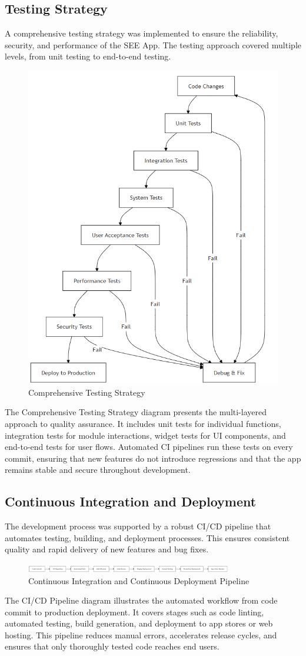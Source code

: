 ﻿\documentclass[12pt,a4paper]{article}
\newcommand{\sectiontitle}[1]{\subsection{#1}}
\begin{document}
\sectiontitle{Testing Strategy}

A comprehensive testing strategy was implemented to ensure the reliability, security, and performance of the SEE App. The testing approach covered multiple levels, from unit testing to end-to-end testing.

\begin{figure}[H]
    \centering
    \includegraphics[height=0.35\textwidth,keepaspectratio]{redrawn_diagrams/Figure4_Testing_Strategy.png}
    \caption{Comprehensive Testing Strategy}
    \label{fig:testing-strategy}
\end{figure}
\vspace{0.5em}
The Comprehensive Testing Strategy diagram presents the multi-layered approach to quality assurance. It includes unit tests for individual functions, integration tests for module interactions, widget tests for UI components, and end-to-end tests for user flows. Automated CI pipelines run these tests on every commit, ensuring that new features do not introduce regressions and that the app remains stable and secure throughout development.

\sectiontitle{Continuous Integration and Deployment}

The development process was supported by a robust CI/CD pipeline that automates testing, building, and deployment processes. This ensures consistent quality and rapid delivery of new features and bug fixes.

\begin{figure}[H]
    \centering
    \includegraphics[width=0.8\textwidth,height=0.03\textwidth,keepaspectratio]{redrawn_diagrams/Figure5_CI_CD_Pipeline.png}
    \caption{Continuous Integration and Continuous Deployment Pipeline}
    \label{fig:ci-cd}
\end{figure}
\vspace{0.5em}
The CI/CD Pipeline diagram illustrates the automated workflow from code commit to production deployment. It covers stages such as code linting, automated testing, build generation, and deployment to app stores or web hosting. This pipeline reduces manual errors, accelerates release cycles, and ensures that only thoroughly tested code reaches end users.
\end{document}
